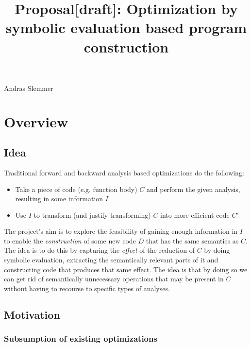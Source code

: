 \documentclass[a4paper]{article}
\begin{document}
\title{Proposal[draft]: Optimization by symbolic evaluation based program construction }
\maketitle
\centerline{
  Andras Slemmer
}

\newcommand{\reduces}{\Downarrow}
\newcommand{\symweak}{\mathbb{W}}
\newcommand{\app}{\ }
\newcommand{\Wrapper}{\text{Wrapper}}
\newcommand{\Worker}{\text{Worker}}

\section{Overview}

\subsection{Idea}

Traditional forward and backward analysis based optimizations do the following:

\begin{itemize}

\item Take a piece of code (e.g. function body) $C$ and perform the given analysis, resulting in some information $I$

\item Use $I$ to transform (and justify transforming) $C$ into more efficient code $C'$

\end{itemize}

The project's aim is to explore the feasibility of gaining enough information in $I$ to enable the \emph{construction} of some new code $D$ that has the same semantics as $C$. The idea is to do this by capturing the \emph{effect} of the reduction of $C$ by doing symbolic evaluation, extracting the semantically relevant parts of it and constructing code that produces that same effect. The idea is that by doing so we can get rid of semantically unnecessary operations that may be present in $C$ without having to recourse to specific types of analyses.

\subsection{Motivation}

\subsubsection*{Subsumption of existing optimizations}
\end{document}
